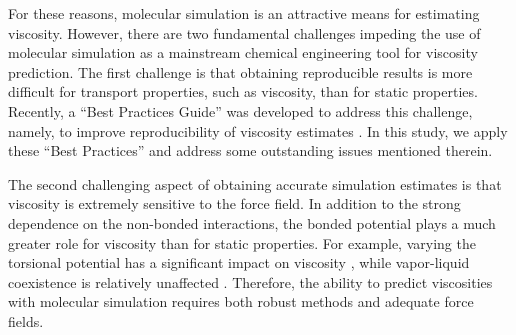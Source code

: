 \documentclass[preprint,review,12pt]{elsarticle}
\begin{document}
	
	
	
	
	
	
	For these reasons, molecular simulation is an attractive means for estimating viscosity. However, there are two fundamental challenges impeding the use of molecular simulation as a mainstream chemical engineering tool for viscosity prediction. The first challenge is that obtaining reproducible results is more difficult for transport properties, such as viscosity, than for static properties. Recently, a ``Best Practices Guide'' was developed to address this challenge, namely, to improve reproducibility of viscosity estimates \cite{Maginn2018}. In this study, we apply these ``Best Practices'' and address some outstanding issues mentioned therein.
	
	The second challenging aspect of obtaining accurate simulation estimates is that viscosity is extremely sensitive to the force field. In addition to the strong dependence on the non-bonded interactions, the bonded potential plays a much greater role for viscosity than for static properties. For example, varying the torsional potential has a significant impact on viscosity \cite{Nieto2006}, while vapor-liquid coexistence is relatively unaffected \cite{Bernard2009}. Therefore, the ability to predict viscosities with molecular simulation requires both robust methods and adequate force fields. 
	
\end{document}
